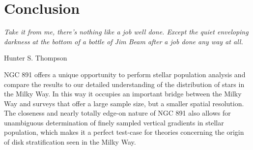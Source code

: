 \chapter[Conclusion]{Conclusion}
\label{chap:conclusion}
\epigraph{\fixspacing\emph{Take it from me, there's nothing like a job
    well done. Except the quiet enveloping darkness at the bottom of a
    bottle of Jim Beam after a job done any way at all.}}{Hunter
    S. Thompson}



\clearpage
NGC 891 offers a unique opportunity to perform stellar population
analysis and compare the results to our detailed understanding of the
distribution of stars in the Milky Way. In this way it occupies an
important bridge between the Milky Way and surveys that offer a large
sample size, but a smaller spatial resolution. The closeness and
nearly totally edge-on nature of NGC 891 also allows for unambiguous
determination of finely sampled vertical gradients in stellar
population, which makes it a perfect test-case for theories concerning
the origin of disk stratification seen in the Milky Way.

